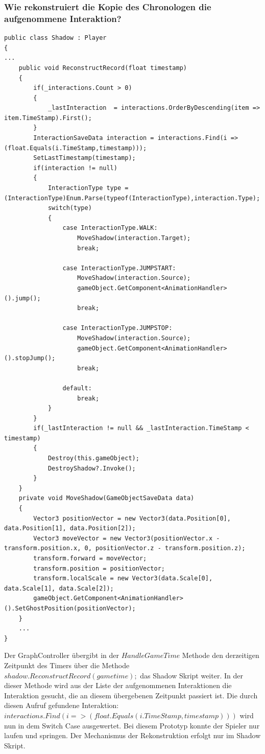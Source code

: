 \subsubsection{Wie rekonstruiert die Kopie des Chronologen die aufgenommene Interaktion?}\label{sec:good_04}
\begin{lstlisting}[caption={Rekonstruktionsmethode der Kopie des Chronologen}, label={sec:reconstructing_old}]
public class Shadow : Player
{ 
...
    public void ReconstructRecord(float timestamp)
    {
        if(_interactions.Count > 0)
        {
            _lastInteraction  = interactions.OrderByDescending(item => item.TimeStamp).First();
        }
        InteractionSaveData interaction = interactions.Find(i => (float.Equals(i.TimeStamp,timestamp)));
        SetLastTimestamp(timestamp);
        if(interaction != null)
        {
            InteractionType type = (InteractionType)Enum.Parse(typeof(InteractionType),interaction.Type);
            switch(type)
            {
                case InteractionType.WALK:
                    MoveShadow(interaction.Target);
                    break;

                case InteractionType.JUMPSTART:
                    MoveShadow(interaction.Source);
                    gameObject.GetComponent<AnimationHandler>().jump();
                    break;

                case InteractionType.JUMPSTOP:
                    MoveShadow(interaction.Source);
                    gameObject.GetComponent<AnimationHandler>().stopJump();
                    break;

                default:
                    break;
            }
        }
        if(_lastInteraction != null && _lastInteraction.TimeStamp < timestamp)
        {
            Destroy(this.gameObject);
            DestroyShadow?.Invoke();
        }
    }
    private void MoveShadow(GameObjectSaveData data)
    {
        Vector3 positionVector = new Vector3(data.Position[0], data.Position[1], data.Position[2]);
        Vector3 moveVector = new Vector3(positionVector.x - transform.position.x, 0, positionVector.z - transform.position.z);
        transform.forward = moveVector;
        transform.position = positionVector;
        transform.localScale = new Vector3(data.Scale[0], data.Scale[1], data.Scale[2]);
        gameObject.GetComponent<AnimationHandler>().SetGhostPosition(positionVector);
    }
    ...
}
\end{lstlisting}

Der GraphController übergibt in der $HandleGameTime$ Methode den derzeitigen Zeitpunkt des Timers über die Methode $ shadow.ReconstructRecord(gametime);$ das Shadow Skript weiter. In der dieser Methode wird aus der Liste der aufgenommenen Interaktionen die Interaktion gesucht, die an diesem übergebenen Zeitpunkt passiert ist. Die durch diesen Aufruf gefundene Interaktion: $interactions.Find(i => (float.Equals(i.TimeStamp,timestamp)))$ wird nun in dem Switch Case ausgewertet. Bei diesem Prototyp konnte der Spieler nur laufen und springen.
Der Mechanismus der Rekonstruktion erfolgt nur im Shadow Skript.

